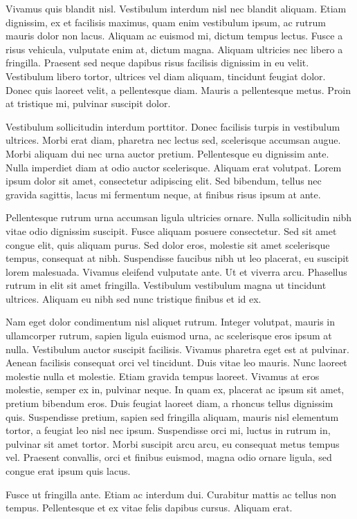 Vivamus quis blandit nisl. Vestibulum interdum nisl nec blandit aliquam. Etiam dignissim, ex et facilisis maximus, quam enim vestibulum ipsum, ac rutrum mauris dolor non lacus. Aliquam ac euismod mi, dictum tempus lectus. Fusce a risus vehicula, vulputate enim at, dictum magna. Aliquam ultricies nec libero a fringilla. Praesent sed neque dapibus risus facilisis dignissim in eu velit. Vestibulum libero tortor, ultrices vel diam aliquam, tincidunt feugiat dolor. Donec quis laoreet velit, a pellentesque diam. Mauris a pellentesque metus. Proin at tristique mi, pulvinar suscipit dolor.

Vestibulum sollicitudin interdum porttitor. Donec facilisis turpis in vestibulum ultrices. Morbi erat diam, pharetra nec lectus sed, scelerisque accumsan augue. Morbi aliquam dui nec urna auctor pretium. Pellentesque eu dignissim ante. Nulla imperdiet diam at odio auctor scelerisque. Aliquam erat volutpat. Lorem ipsum dolor sit amet, consectetur adipiscing elit. Sed bibendum, tellus nec gravida sagittis, lacus mi fermentum neque, at finibus risus ipsum at ante.

Pellentesque rutrum urna accumsan ligula ultricies ornare. Nulla sollicitudin nibh vitae odio dignissim suscipit. Fusce aliquam posuere consectetur. Sed sit amet congue elit, quis aliquam purus. Sed dolor eros, molestie sit amet scelerisque tempus, consequat at nibh. Suspendisse faucibus nibh ut leo placerat, eu suscipit lorem malesuada. Vivamus eleifend vulputate ante. Ut et viverra arcu. Phasellus rutrum in elit sit amet fringilla. Vestibulum vestibulum magna ut tincidunt ultrices. Aliquam eu nibh sed nunc tristique finibus et id ex.

Nam eget dolor condimentum nisl aliquet rutrum. Integer volutpat, mauris in ullamcorper rutrum, sapien ligula euismod urna, ac scelerisque eros ipsum at nulla. Vestibulum auctor suscipit facilisis. Vivamus pharetra eget est at pulvinar. Aenean facilisis consequat orci vel tincidunt. Duis vitae leo mauris. Nunc laoreet molestie nulla et molestie. Etiam gravida tempus laoreet. Vivamus at eros molestie, semper ex in, pulvinar neque. In quam ex, placerat ac ipsum sit amet, pretium bibendum eros. Duis feugiat laoreet diam, a rhoncus tellus dignissim quis. Suspendisse pretium, sapien sed fringilla aliquam, mauris nisl elementum tortor, a feugiat leo nisl nec ipsum. Suspendisse orci mi, luctus in rutrum in, pulvinar sit amet tortor. Morbi suscipit arcu arcu, eu consequat metus tempus vel. Praesent convallis, orci et finibus euismod, magna odio ornare ligula, sed congue erat ipsum quis lacus.

Fusce ut fringilla ante. Etiam ac interdum dui. Curabitur mattis ac tellus non tempus. Pellentesque et ex vitae felis dapibus cursus. Aliquam erat.